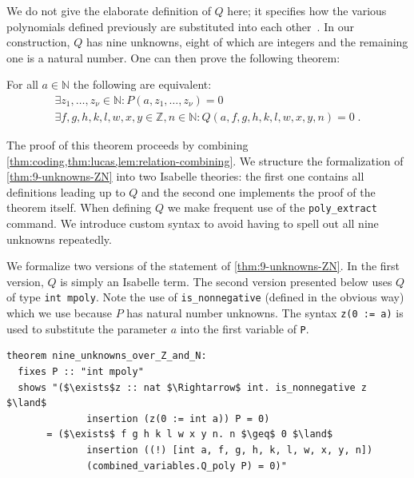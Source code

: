 \documentclass[a4paper,USenglish,cleveref,autoref,thm-restate]{lipics-v2021}
\newcommand{\N}{{\mathbb N}}
\newcommand{\Z}{{\mathbb Z}}
\begin{document}
We do not give the elaborate definition of $Q$ here; it specifies how the various polynomials defined previously are substituted into each other~\cite[Definition 5.2]{manuscript}. In our construction, $Q$ has nine unknowns, eight of which are integers and the remaining one is a natural number. One can then prove the following theorem:

\begin{theorem}[9 Unknowns in $\Z$ and $\N$~{\cite[Theorem 3]{manuscript}}] \label{thm:9-unknowns-ZN}
For all $a \in \N$ the following are equivalent: 
\begin{gather} \label{eq:P-solution}
\exists z_1, \ldots, z_\nu \in \N \colon 
    P(a, z_1, \ldots, z_\nu) = 0 \\
\exists f, g, h, k, l, w, x, y \in \Z, n \in \N \colon 
    Q(a, f, g, h, k, l, w, x, y, n) = 0 \;. 
    \label{eq:Q-solution}
\end{gather}
\end{theorem}

The proof of this theorem proceeds by combining \cref{thm:coding,thm:lucas,lem:relation-combining}. We structure the formalization of \cref{thm:9-unknowns-ZN} into two Isabelle theories: the first one contains all definitions leading up to $Q$ and the second one implements the proof of the theorem itself. When defining $Q$ we make frequent use of the \texttt{poly\_extract} command. We introduce custom syntax to avoid having to spell out all nine unknowns repeatedly. 

We formalize two versions of the statement of \cref{thm:9-unknowns-ZN}. In the first version, $Q$ is simply an Isabelle term. The second version presented below uses $Q$ of type \texttt{int mpoly}. Note the use of \texttt{is\_nonnegative} (defined in the obvious way) which we use because $P$ has natural number unknowns. The syntax \lstinline{z(0 := a)} is used to substitute the parameter $a$ into the first variable of \texttt{P}. 
\begin{lstlisting}
theorem nine_unknowns_over_Z_and_N: 
  fixes P :: "int mpoly"
  shows "($\exists$z :: nat $\Rightarrow$ int. is_nonnegative z $\land$ 
              insertion (z(0 := int a)) P = 0) 
       = ($\exists$ f g h k l w x y n. n $\geq$ 0 $\land$
              insertion ((!) [int a, f, g, h, k, l, w, x, y, n])
              (combined_variables.Q_poly P) = 0)"
\end{lstlisting}
\end{document}
